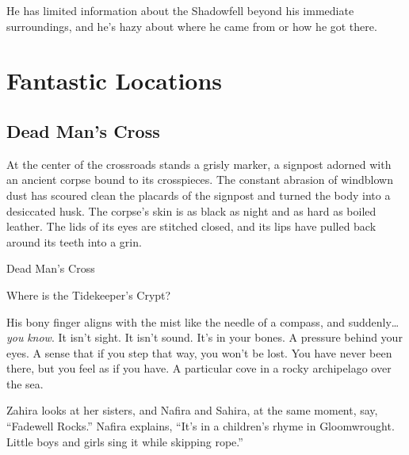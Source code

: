 \documentclass[10pt,twocolumn]{article}
\newcommand{\stickysubsubsection}{\needspace{3\baselineskip}}
\let\oldtextbf\textbf
\renewcommand{\textbf}[1]{\oldtextbf{{#1}}}
\renewenvironment{quote}
  {%
    \begingroup
      \setlength{\parindent}{1em}%
      \setlength{\parskip}{0pt}%
      \begin{tcolorbox}[myquote,
        before upper={%
          \let\textbf\oldtextbf
          \setlength{\parindent}{1.5em}%
          \setlength{\parskip}{0pt}%
          \noindent              %
        }%
      ]%
  }
  {%
      \end{tcolorbox}%
    \endgroup
  }
\begin{document}
He has limited information about the Shadowfell beyond his immediate
surroundings, and he's hazy about where he came from or how he got
there.

\section{Fantastic Locations}\label{fantastic-locations}

\subsection{Dead Man's Cross}\label{dead-mans-cross}

\begin{quote}
At the center of the crossroads stands a grisly marker, a signpost
adorned with an ancient corpse bound to its crosspieces. The constant
abrasion of windblown dust has scoured clean the placards of the
signpost and turned the body into a desiccated husk. The corpse's skin
is as black as night and as hard as boiled leather. The lids of its eyes
are stitched closed, and its lips have pulled back around its teeth into
a grin.
\end{quote}

\begin{tcolorbox}[
  colback={imagecolor},
  coltext=black,
  colframe=black,
  boxrule=1pt,
  arc=6pt,
  left=4pt,
  right=4pt,
  top=2pt,
  bottom=2pt,
  boxsep=4pt,
  before skip=10pt,
  after skip=10pt,
  fontupper={\blockquoteFont\small\linespread{0.9}\selectfont\color{black}}
]

\faPhotoVideo\hspace{0.8em}\begin{minipage}[t]{\dimexpr\linewidth-1.8em\hangindent=1.8em\hangafter=0}Dead
Man's Cross

\end{minipage}\end{tcolorbox}

\vspace{6pt}\noindent\stickysubsubsection

{\headerfont\normalsize \color{subsubsectioncolor}Where is the Tidekeeper’s Crypt?}

\par

\begin{quote}
His bony finger aligns with the mist like the needle of a compass, and
suddenly\ldots{} \emph{you} \emph{know}. It isn't sight. It isn't sound.
It's in your bones. A pressure behind your eyes. A sense that if you
step that way, you won't be lost. You have never been there, but you
feel as if you have. A particular cove in a rocky archipelago over the
sea.

Zahira looks at her sisters, and Nafira and Sahira, at the same moment,
say, ``Fadewell Rocks.'' Nafira explains, ``It's in a children's rhyme
in Gloomwrought. Little boys and girls sing it while skipping rope.''
\end{quote}
\end{document}
